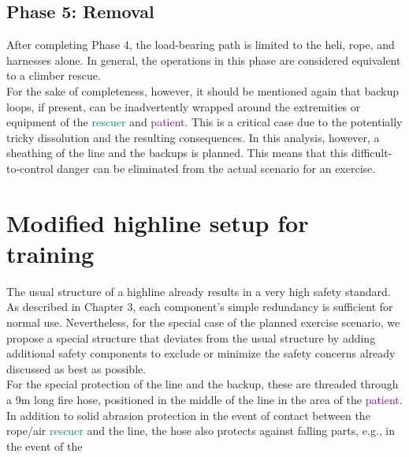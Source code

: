 \documentclass[a4paper,10pt]{scrartcl}
\begin{document}
\clearpage
\subsection{Phase 5: Removal}
\label{sec:fha:phase5}

After completing Phase 4, the load-bearing path is limited to the heli, rope, and harnesses alone. In general, the operations in this phase are considered equivalent to a climber rescue.\\
For the sake of completeness, however, it should be mentioned again that backup loops, if present, can be inadvertently wrapped around the extremities or equipment of the \textcolor{teal}{rescuer} and \textcolor{purple}{patient}. This is a critical case due to the potentially tricky dissolution and the resulting consequences. In this analysis, however, a sheathing of the line and the backups is planned. This means that this difficult-to-control danger can be eliminated from the actual scenario for an exercise.


\section{Modified highline setup for training}
\label{sec:modified}

The usual structure of a highline already results in a very high safety standard. As described in Chapter 3, each component's simple redundancy is sufficient for normal use. Nevertheless, for the special case of the planned exercise scenario, we propose a special structure that deviates from the usual structure by adding additional safety components to exclude or minimize the safety concerns already discussed as best as possible.\\
For the special protection of the line and the backup, these are threaded through a 9m long fire hose, positioned in the middle of the line in the area of the \textcolor{purple}{patient}. In addition to solid abrasion protection in the event of contact between the rope/air \textcolor{teal}{rescuer} and the line, the hose also protects against falling parts, e.g., in the event of the
\end{document}
